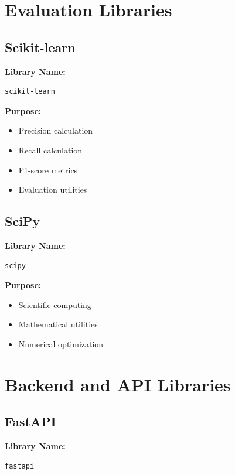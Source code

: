 \documentclass[12pt]{article}
\begin{document}
\section{Evaluation Libraries}

\subsection{Scikit-learn}

\textbf{Library Name:}
\begin{verbatim}
scikit-learn
\end{verbatim}

\textbf{Purpose:}
\begin{itemize}
    \item Precision calculation
    \item Recall calculation
    \item F1-score metrics
    \item Evaluation utilities
\end{itemize}

\subsection{SciPy}

\textbf{Library Name:}
\begin{verbatim}
scipy
\end{verbatim}

\textbf{Purpose:}
\begin{itemize}
    \item Scientific computing
    \item Mathematical utilities
    \item Numerical optimization
\end{itemize}

\section{Backend and API Libraries}

\subsection{FastAPI}

\textbf{Library Name:}
\begin{verbatim}
fastapi
\end{verbatim}
\end{document}
